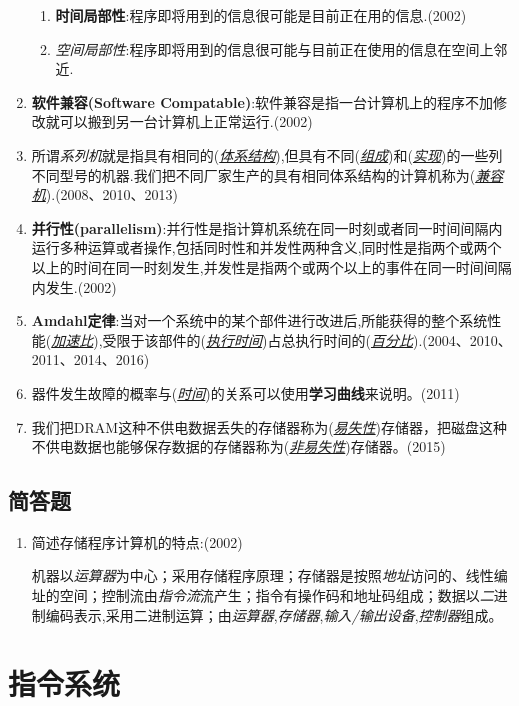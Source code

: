 \documentclass[a4paper]{ctexart}
\newcommand{\blank}[1]{(\emph{\underline{#1}})}
\begin{document}
\begin{enumerate}
  \begin{enumerate}
    \item \textbf{时间局部性}:程序即将用到的信息很可能是目前正在用的信息.(2002)
    \item \emph{空间局部性}:程序即将用到的信息很可能与目前正在使用的信息在空间上邻近.
  \end{enumerate}
  \item \textbf{软件兼容(Software Compatable)}:软件兼容是指一台计算机上的程序不加修改就可以搬到另一台计算机上正常运行.(2002)
  \item 所谓\emph{系列机}就是指具有相同的(\emph{\underline{体系结构}}),但具有不同(\emph{\underline{组成}})和(\emph{\underline{实现}})的一些列不同型号的机器.我们把不同厂家生产的具有相同体系结构的计算机称为(\emph{\underline{兼容机}}).(2008、2010、2013)
  \item \textbf{并行性(parallelism)}:并行性是指计算机系统在同一时刻或者同一时间间隔内运行多种运算或者操作,包括同时性和并发性两种含义,同时性是指两个或两个以上的时间在同一时刻发生,并发性是指两个或两个以上的事件在同一时间间隔内发生.(2002)
  \item \textbf{Amdahl定律}:当对一个系统中的某个部件进行改进后,所能获得的整个系统性能\blank{加速比},受限于该部件的\blank{执行时间}占总执行时间的\blank{百分比}.(2004、2010、2011、2014、2016)
  \item 器件发生故障的概率与\blank{时间}的关系可以使用\textbf{学习曲线}来说明。(2011)
  \item 我们把DRAM这种不供电数据丢失的存储器称为\blank{易失性}存储器，把磁盘这种不供电数据也能够保存数据的存储器称为\blank{非易失性}存储器。(2015)
\end{enumerate}
\subsection{简答题}
\begin{enumerate}
  \item 简述存储程序计算机的特点:(2002)
  
  机器以\emph{运算器}为中心；采用存储程序原理；存储器是按照\emph{地址}访问的、线性编址的空间；控制流由\emph{指令流}流产生；指令有操作码和地址码组成；数据以\emph{二}进制编码表示,采用二进制运算；由\emph{运算器},\emph{存储器},\emph{输入/输出设备},\emph{控制器}组成。

  
\end{enumerate}

\newpage
\section{指令系统}
\end{document}
